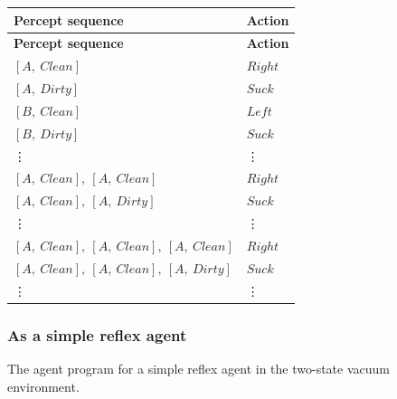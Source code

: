\begin{customArrayStretch}{1.3}
\begin{longtable}{|l|l|}

\hline
\textbf{Percept sequence} & \textbf{Action} \\ \hline
\endhead

\hline
\textbf{Percept sequence} & \textbf{Action} \\ \hline
\endfirsthead

\hline\endfoot
\hline\endlastfoot


$[A, \ Clean]$ & $Right$ \\ 
$[A, \ Dirty]$ & $Suck$ \\ 
$[B, \ Clean]$ & $Left$ \\ 
$[B, \ Dirty]$ & $Suck$ \\ 

\vdots & \vdots \\

$[A, \ Clean],\ [A, \ Clean]$ & $Right$ \\ 
$[A, \ Clean],\ [A, \ Dirty]$ & $Suck$ \\ 

\vdots & \vdots \\

$[A, \ Clean],\ [A, \ Clean],\ [A, \ Clean]$ & $Right$ \\ 
$[A, \ Clean],\ [A, \ Clean],\ [A, \ Dirty]$ & $Suck$ \\ 

\vdots & \vdots \\

\end{longtable}
\end{customArrayStretch}





\subsubsection{As a simple reflex agent}

\begin{algorithm}[H]
    \caption{The agent program for a simple reflex agent in the two-state vacuum environment.  \cite{ai/book/Artificial-Intelligence-A-Modern-Approach/Russell-Norvig}}

\end{algorithm}















